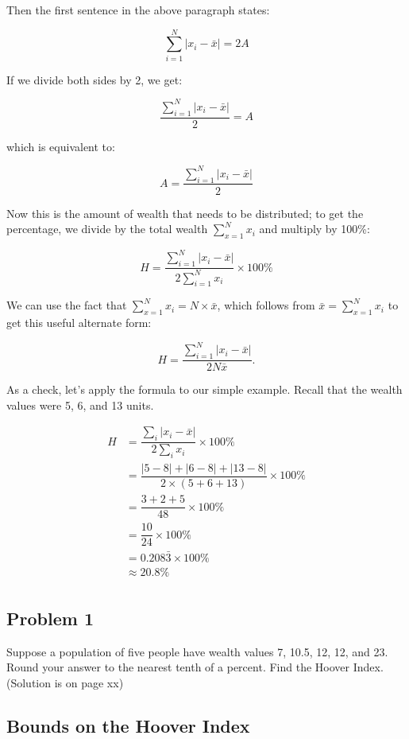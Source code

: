 \documentclass[12pt]{memoir}\usepackage[]{graphicx}\usepackage[table]{xcolor}
\begin{document}
Then the first sentence in the above paragraph states: 

$$\sum_{i = 1}^N |x_i - \bar{x}| = 2A$$

If we divide both sides by 2, we get: 

$$\dfrac{\sum_{i = 1}^N |x_i - \bar{x}|}{2} = A$$

which is equivalent to: 

$$A = \dfrac{\sum_{i = 1}^N |x_i - \bar{x}|}{2}$$

Now this is the amount of wealth that needs to be distributed; to get 
the percentage, we divide by the total wealth $\sum_{x = 1}^N x_i$
and multiply by 100\%: 

$$H = \dfrac{\sum_{i = 1}^N |x_i - \bar{x}|}{2\sum_{i = 1}^N x_i} \times 100\%$$

We can use the fact that $\sum_{x = 1}^N x_i = N\times \bar{x}$, which follows 
from $\bar{x} = \sum_{x = 1}^N x_i$ to get this useful alternate form: 

$$H = \dfrac{\sum_{i = 1}^N |x_i - \bar{x}|}{2N\bar{x}}.$$

As a check, let's apply the formula to our simple example.  Recall that 
the wealth values were 5, 6, and 13 units.  

\begin{align*}
H &= \dfrac{\sum_i |x_i - \bar{x}|}{2\sum_i x_i}\times 100\% \\[10pt]
&= \dfrac{|5 - 8| + |6 - 8| + |13 - 8|}{2\times (5 + 6 + 13)} \times 100\% \\[10pt]
&= \dfrac{3 + 2 + 5}{48} \times 100\% \\[10pt]
&= \dfrac{10}{24} \times 100\% \\[10pt]
&= 0.208\bar{3}\times 100\% \\[10pt]
&\approx 20.8\% \\
\end{align*}

\subsection*{Problem 1}  Suppose a population of five people have wealth values
7, 10.5, 12, 12, and 23.  Round your answer to the nearest tenth of a percent.
Find the Hoover Index. (Solution is on page xx) 

\subsection*{Bounds on the Hoover Index}
\end{document}
